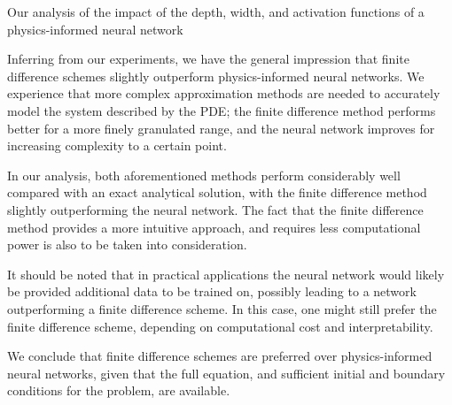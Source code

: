 
Our analysis of the impact of the depth, width, and activation functions of a physics-informed neural network

Inferring from our experiments, we have the general impression that finite difference schemes slightly outperform physics-informed neural networks. 
We experience that more complex approximation methods are needed to accurately model the system described by the PDE; the finite difference method performs better for a more finely granulated range, and the neural network improves for increasing complexity to a certain point. 

In our analysis, both aforementioned methods perform considerably well compared with an exact analytical solution, with the finite difference method slightly outperforming the neural network. 
The fact that the finite difference method provides a more intuitive approach, and requires less computational power is also to be taken into consideration.

It should be noted that in practical applications the neural network would likely be provided additional data to be trained on, possibly leading to a network outperforming a finite difference scheme. In this case, one might still prefer the finite difference scheme, depending on computational cost and interpretability. 

We conclude that finite difference schemes are preferred over physics-informed neural networks, given that the full equation, and sufficient initial and boundary conditions for the problem, are available. 